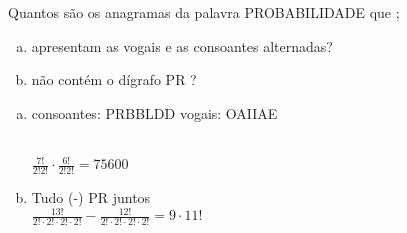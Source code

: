 \begin{ex}
 Quantos são os anagramas da palavra PROBABILIDADE que ;
    \begin{enumerate}[(a)]
    \item apresentam as vogais e as consoantes alternadas?
    \item não contém o dígrafo PR ?
    \end{enumerate}
      \begin{sol}
          \phantom{A}  
        \begin{enumerate} [(a)]
            \item consoantes: PRBBLDD     vogais: OAIIAE \\ 
             \\
          $\frac{7!}{2!2!}\cdot\frac{6!}{2!2!}=75600$
             \item Tudo (-) PR juntos \\ 
             $\frac{13!}{2!\cdot2!\cdot2!\cdot2!}-\frac{12!}{2!\cdot2!\cdot2!\cdot2!}=9\cdot11!$
        \end{enumerate}
      \end{sol}
\end{ex}